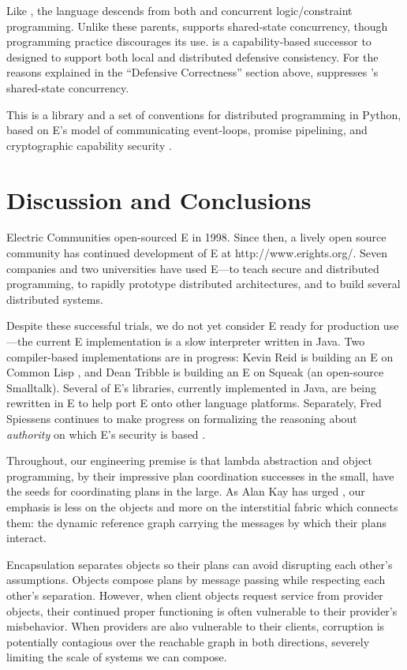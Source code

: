 \documentclass{llncs}
\begin{document}
 Like , the  language
\cite{VanRoyHaridi} descends from both  and concurrent
logic/constraint programming. Unlike these parents,  supports
shared-state concurrency, though  programming practice
discourages its use.  \cite{oze} is a capability-based
successor to  designed to support both local and distributed
defensive consistency. For the reasons explained in the ``Defensive
Correctness'' section above,  suppresses 's
shared-state concurrency.

 This is a library and a set of
conventions for distributed programming in Python, based on E's model
of communicating event-loops, promise pipelining, and cryptographic
capability security \cite{twisted}.

\section{Discussion and Conclusions}

Electric Communities open-sourced E in 1998. Since then, a lively open
source community has continued development of E at
http://www.erights.org/. Seven companies and two universities have
used E---to teach secure and distributed programming, to rapidly
prototype distributed architectures, and to build several distributed
systems.

Despite these successful trials, we do not yet consider E ready for
production use---the current E implementation is a slow interpreter
written in Java.  Two compiler-based implementations are in progress:
Kevin Reid is building an E on Common Lisp \cite{reid:e-on-cl}, and
Dean Tribble is building an E on Squeak (an open-source
Smalltalk). Several of E's libraries, currently implemented in Java,
are being rewritten in E to help port E onto other language
platforms. Separately, Fred Spiessens continues to make progress on
formalizing the reasoning about \emph{authority} on which E's security
is based \cite{tgc}.

Throughout, our engineering premise is that lambda abstraction and
object programming, by their impressive plan coordination successes in
the small, have the seeds for coordinating plans in the large. As Alan
Kay has urged \cite{kay:ma}, our emphasis is less on the objects and
more on the interstitial fabric which connects them: the dynamic
reference graph carrying the messages by which their plans interact.

Encapsulation separates objects so their plans can avoid disrupting
each other's assumptions. Objects compose plans by message passing
while respecting each other's separation.  However, when client objects
request service from provider objects, their continued proper
functioning is often vulnerable to their provider's misbehavior. When
providers are also vulnerable to their clients, corruption is
potentially contagious over the reachable graph in both directions,
severely limiting the scale of systems we can compose.
\end{document}
